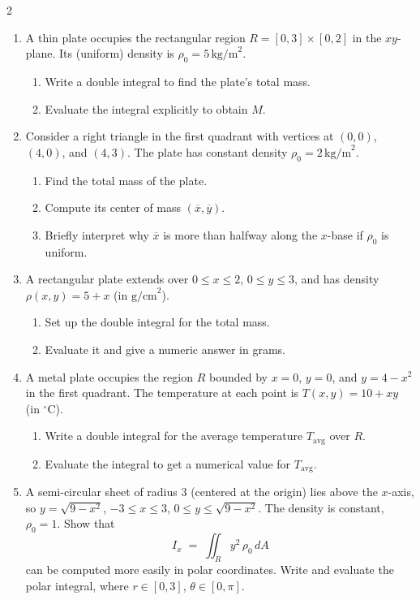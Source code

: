 \begin{multicols}{2}
\begin{enumerate}
\item A thin plate occupies the rectangular region $R=[0,3]\times[0,2]$ in the $xy$-plane. Its (uniform) density is $\rho_0=5\,\text{kg/m}^2$.  
\begin{enumerate}
   \item Write a double integral to find the plate’s total mass.  
   \item Evaluate the integral explicitly to obtain $M$.
\end{enumerate}

\item Consider a right triangle in the first quadrant with vertices at $(0,0)$, $(4,0)$, and $(4,3)$. The plate has constant density $\rho_0=2\,\text{kg/m}^2$.  
\begin{enumerate}
   \item Find the total mass of the plate.  
   \item Compute its center of mass $(\overline{x}, \overline{y})$.  
   \item Briefly interpret why $\overline{x}$ is more than halfway along the $x$-base if $\rho_0$ is uniform.
\end{enumerate}

\item A rectangular plate extends over $0\le x\le 2$, $0\le y\le 3$, and has density $\rho(x,y)=5+x$ (in $\text{g/cm}^2$).  
\begin{enumerate}
   \item Set up the double integral for the total mass.  
   \item Evaluate it and give a numeric answer in grams.
\end{enumerate}

\item A metal plate occupies the region $R$ bounded by $x=0$, $y=0$, and $y=4-x^2$ in the first quadrant. The temperature at each point is $T(x,y)=10+xy$ (in ${}^{\circ}\text{C}$).  
\begin{enumerate}
   \item Write a double integral for the average temperature $T_{\text{avg}}$ over $R$.  
   \item Evaluate the integral to get a numerical value for $T_{\text{avg}}$.
\end{enumerate}

\item A semi-circular sheet of radius $3$ (centered at the origin) lies above the $x$-axis, so $y=\sqrt{9-x^2}$, $-3\le x\le 3$, $0\le y\le \sqrt{9-x^2}$. The density is constant, $\rho_0=1$. Show that  
\[
I_x \;=\;\iint_R y^2\,\rho_0\,dA
\]
can be computed more easily in polar coordinates. Write and evaluate the polar integral, where $r\in[0,3]$, $\theta\in[0,\pi]$.


\end{enumerate}
\end{multicols}
